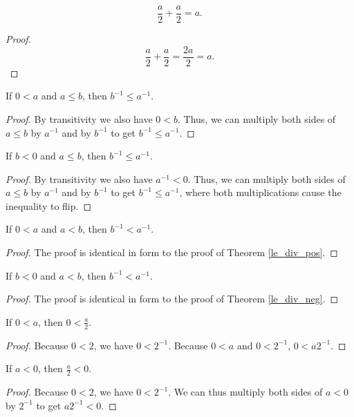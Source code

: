 \documentclass[../../math.tex]{subfiles}
\begin{document}
\begin{theorem}
    \[
        \frac{a}{2} + \frac{a}{2} = a.
    \]
\end{theorem}
\begin{proof}
    \[
        \frac{a}{2} + \frac{a}{2} = \frac{2a}{2} = a.
    \]
\end{proof}

\begin{theorem} \label{le_div_pos}
    If $0 < a$ and $a \leq b$, then $b^{-1} \leq a^{-1}$.
\end{theorem}
\begin{proof}
    By transitivity we also have $0 < b$.  Thus, we can multiply both sides
    of $a \leq b$ by $a^{-1}$ and by $b^{-1}$ to get $b^{-1} \leq a^{-1}$.
\end{proof}

\begin{theorem} \label{le_div_neg}
    If $b < 0$ and $a \leq b$, then $b^{-1} \leq a^{-1}$.
\end{theorem}
\begin{proof}
    By transitivity we also have $a^{-1} < 0$.  Thus, we can multiply both sides
    of $a \leq b$ by $a^{-1}$ and by $b^{-1}$ to get $b^{-1} \leq a^{-1}$, where
    both multiplications cause the inequality to flip.
\end{proof}

\begin{theorem}
    If $0 < a$ and $a < b$, then $b^{-1} < a^{-1}$.
\end{theorem}
\begin{proof}
    The proof is identical in form to the proof of Theorem \ref{le_div_pos}.
\end{proof}

\begin{theorem}
    If $b < 0$ and $a < b$, then $b^{-1} < a^{-1}$.
\end{theorem}
\begin{proof}
    The proof is identical in form to the proof of Theorem \ref{le_div_neg}.
\end{proof}

\begin{theorem}
    If $0 < a$, then $0 < \frac{a}{2}$.
\end{theorem}
\begin{proof}
    Because $0 < 2$, we have $0 < 2^{-1}$.  Because $0 < a$ and $0 < 2^{-1}$, $0
    < a2^{-1}$.
\end{proof}

\begin{theorem}
    If $a < 0$, then $\frac{a}{2} < 0$.
\end{theorem}
\begin{proof}
    Because $0 < 2$, we have $0 < 2^{-1}$.  We can thus multiply both sides of
    $a < 0$ by $2^{-1}$ to get $a2^{-1} < 0$.
\end{proof}
\end{document}
